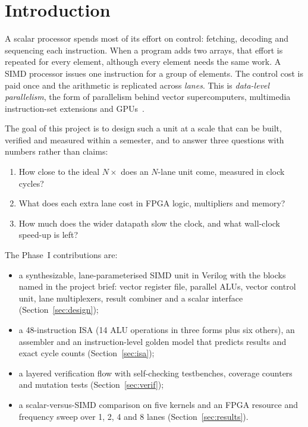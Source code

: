 \documentclass[conference]{IEEEtran}
\begin{document}
\section{Introduction}

A scalar processor spends most of its effort on control: fetching, decoding and
sequencing each instruction. When a program adds two arrays, that effort is
repeated for every element, although every element needs the same work. A SIMD
processor issues one instruction for a group of elements. The control cost is paid
once and the arithmetic is replicated across \emph{lanes}. This is
\emph{data-level parallelism}, the form of parallelism behind vector
supercomputers, multimedia instruction-set extensions and GPUs~\cite{hp6}.

The goal of this project is to design such a unit at a scale that can be built,
verified and measured within a semester, and to answer three questions with
numbers rather than claims:
\begin{enumerate}
\item How close to the ideal $N\times$ does an $N$-lane unit come, measured in clock cycles?
\item What does each extra lane cost in FPGA logic, multipliers and memory?
\item How much does the wider datapath slow the clock, and what wall-clock speed-up is left?
\end{enumerate}

The Phase~I contributions are:
\begin{itemize}
\item a synthesizable, lane-parameterised SIMD unit in Verilog with the blocks named
      in the project brief: vector register file, parallel ALUs, vector control unit,
      lane multiplexers, result combiner and a scalar interface (Section~\ref{sec:design});
\item a 48-instruction ISA (14 ALU operations in three forms plus six
      others), an assembler and an instruction-level golden model that
      predicts results and exact cycle counts (Section~\ref{sec:isa});
\item a layered verification flow with self-checking testbenches, coverage counters
      and mutation tests (Section~\ref{sec:verif});
\item a scalar-versus-SIMD comparison on five kernels and an FPGA resource and
      frequency sweep over 1, 2, 4 and 8 lanes (Section~\ref{sec:results}).
\end{itemize}
\end{document}
